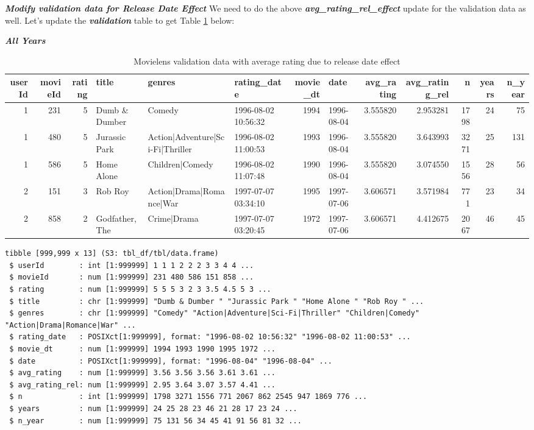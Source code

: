 \documentclass[
]{article}
\begin{document}
\newpage

\textbf{\emph{Modify validation data for Release Date Effect}} We need
to do the above \textbf{\emph{avg\_rating\_rel\_effect}} update for the
validation data as well. Let's update the \textbf{\emph{validation}}
table to get Table
\ref{tbl:movielens_validation_avg_release_date_effect} below:

\textbf{\emph{All Years}}

\begin{table}[H]

\caption{\label{tab:md_7}Movielens validation data with average rating due to release date effect\label{tbl:movielens_validation_avg_release_date_effect}}
\centering
\fontsize{4}{6}\selectfont
\begin{tabular}[t]{rrrlllrlrrrrr}
\toprule
userId & movieId & rating & title & genres & rating\_date & movie\_dt & date & avg\_rating & avg\_rating\_rel & n & years & n\_year\\
\midrule
1 & 231 & 5 & Dumb \& Dumber & Comedy & 1996-08-02 10:56:32 & 1994 & 1996-08-04 & 3.555820 & 2.953281 & 1798 & 24 & 75\\
1 & 480 & 5 & Jurassic Park & Action|Adventure|Sci-Fi|Thriller & 1996-08-02 11:00:53 & 1993 & 1996-08-04 & 3.555820 & 3.643993 & 3271 & 25 & 131\\
1 & 586 & 5 & Home Alone & Children|Comedy & 1996-08-02 11:07:48 & 1990 & 1996-08-04 & 3.555820 & 3.074550 & 1556 & 28 & 56\\
2 & 151 & 3 & Rob Roy & Action|Drama|Romance|War & 1997-07-07 03:34:10 & 1995 & 1997-07-06 & 3.606571 & 3.571984 & 771 & 23 & 34\\
2 & 858 & 2 & Godfather, The & Crime|Drama & 1997-07-07 03:20:45 & 1972 & 1997-07-06 & 3.606571 & 4.412675 & 2067 & 46 & 45\\
\bottomrule
\end{tabular}
\end{table}

\begin{verbatim}
tibble [999,999 x 13] (S3: tbl_df/tbl/data.frame)
 $ userId        : int [1:999999] 1 1 1 2 2 2 3 3 4 4 ...
 $ movieId       : num [1:999999] 231 480 586 151 858 ...
 $ rating        : num [1:999999] 5 5 5 3 2 3 3.5 4.5 5 3 ...
 $ title         : chr [1:999999] "Dumb & Dumber " "Jurassic Park " "Home Alone " "Rob Roy " ...
 $ genres        : chr [1:999999] "Comedy" "Action|Adventure|Sci-Fi|Thriller" "Children|Comedy" "Action|Drama|Romance|War" ...
 $ rating_date   : POSIXct[1:999999], format: "1996-08-02 10:56:32" "1996-08-02 11:00:53" ...
 $ movie_dt      : num [1:999999] 1994 1993 1990 1995 1972 ...
 $ date          : POSIXct[1:999999], format: "1996-08-04" "1996-08-04" ...
 $ avg_rating    : num [1:999999] 3.56 3.56 3.56 3.61 3.61 ...
 $ avg_rating_rel: num [1:999999] 2.95 3.64 3.07 3.57 4.41 ...
 $ n             : int [1:999999] 1798 3271 1556 771 2067 862 2545 947 1869 776 ...
 $ years         : num [1:999999] 24 25 28 23 46 21 28 17 23 24 ...
 $ n_year        : num [1:999999] 75 131 56 34 45 41 91 56 81 32 ...
\end{verbatim}
\end{document}
